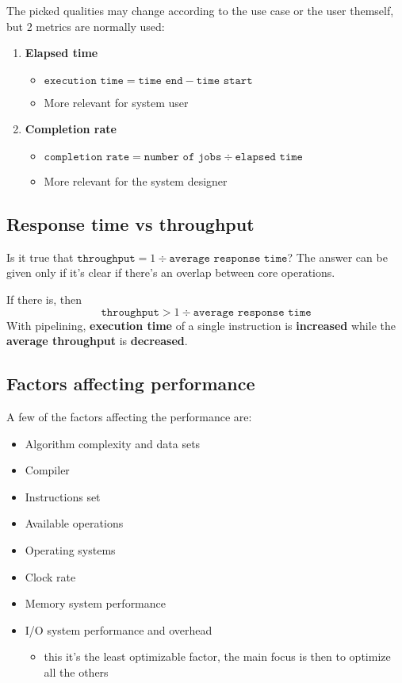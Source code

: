 \documentclass[english]{article}
\begin{document}
The picked qualities may change according to the use case or the user themself,
but 2 metrics are normally used:

\begin{enumerate}
  \item \textbf{Elapsed time}
        \begin{itemize}
          \item \(\texttt{execution time} = \texttt{time end} - \texttt{time start}\)
          \item More relevant for system user
        \end{itemize}
  \item \textbf{Completion rate}
        \begin{itemize}
          \item \(\texttt{completion rate} = \texttt{number of jobs} \div \texttt{elapsed time}\)
          \item More relevant for the system designer
        \end{itemize}
\end{enumerate}

\subsection{Response time vs throughput}

Is it true that
\(\texttt{throughput} = {1} \div { \texttt{average response time}}\)?
The answer can be given only if it's clear if there's an overlap between core operations.

If there is, then \[ \texttt{throughput} > {1} \div {\texttt{average response time}} \]
With pipelining, \textbf{execution time} of a single instruction is \textbf{increased} while the \textbf{average throughput} is \textbf{decreased}.

\subsection{Factors affecting performance}

A few of the factors affecting the performance are:

\begin{itemize}
  \item Algorithm complexity and data sets
  \item Compiler
  \item Instructions set
  \item Available operations
  \item Operating systems
  \item Clock rate
  \item Memory system performance
  \item I/O system performance and overhead
        \begin{itemize}
          \item this it's the least optimizable factor, the main focus is then to optimize all the others
        \end{itemize}
\end{itemize}
\end{document}
